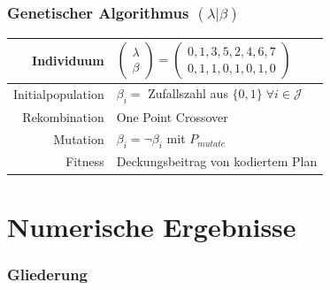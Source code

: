 \begin{frame}
	\frametitle{Genetischer Algorithmus $(\lambda|\beta)$}
	\begin{small}
		\begin{center}
			\begin{tabular}{rl}
				\hline 
				Individuum & $\begin{pmatrix}\lambda\\\beta\end{pmatrix}=\begin{pmatrix}0,1,3,5,2,4,6,7\\0,1,1,0,1,0,1,0\end{pmatrix}$\parbox[c][40pt][c]{0pt}{}\tabularnewline
				\hline 
				Initialpopulation & $\beta_i=$ Zufallszahl aus $\{0,1\} \; \forall i \in \mathcal{J}$\tabularnewline
				\hline 
				Rekombination & One Point Crossover\tabularnewline
				\hline 
				Mutation & $\beta_i=\neg \beta_i$ mit $P_{mutate}$\tabularnewline
				\hline 
				Fitness & Deckungsbeitrag von kodiertem Plan\tabularnewline
				\hline 
			\end{tabular}
		\end{center}
	\end{small}
\end{frame}


\section{Numerische Ergebnisse}
\begin{frame}[noframenumbering]
\frametitle{Gliederung}
\end{frame}


